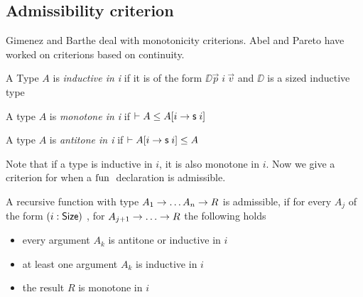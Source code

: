 \subsection{Admissibility criterion}
Gimenez and Barthe deal with monotonicity criterions.
Abel and Pareto have worked on criterions based on continuity.
\begin{definition}
A Type $A$ is \emph{inductive in i} if it is of the form $ \DD \vec{p} \; i \: \vec{v} $ and $\DD$ is a sized inductive type
\end{definition}
\begin{definition}
A type $A$ is \emph{monotone in i} if $ \vdash A\leq A[i \rightarrow \mathsf{s}\; i ]$ 
\end{definition}
\begin{definition}
A type $A$ is \emph{antitone in i} if $ \vdash A[i \rightarrow \mathsf{s}\; i ]\leq A$ 
\end{definition}
Note that if a type is inductive in $i$, it is also monotone in $i$. 
Now we give a criterion for when a $\mathrm{fun}\;$ declaration is admissible.
\begin{definition}
A recursive function with type $ A_1 \rightarrow \dots A_n \rightarrow R $ is admissible, if
for every $A_j$ of the form $(i : \mathsf{Size} )$ , for $A_{j + 1} \ra \dots \ra R $ the following holds 
\begin{itemize}
\item
every argument $A_k$ is antitone or inductive in $i$
\item
at least one argument $A_k$ is inductive in $i$
\item
the result $R$ is monotone in $i$  
\end{itemize}
\end{definition}
